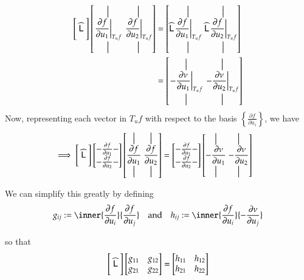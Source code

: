 	\begin{align}
	\Bigg[ \;\widehat{\mathsf{L}}\; \Bigg]
	\left[ \overset{\big\vert}{\underset{\big\vert}{\left.\frac{\partial f}{\partial u_1}\right|_{T_u f}}} \;
			\overset{\big\vert}{\underset{\big\vert}{\left.\frac{\partial f}{\partial u_2}\right|_{T_u f}}} \right]
			&= \left[ \widehat{\mathsf{L}} \overset{\big\vert}{\underset{\big\vert}{\left.\frac{\partial f}{\partial u_1}\right|_{T_u f}}} \;
			\widehat{\mathsf{L}} \overset{\big\vert}{\underset{\big\vert}{\left.\frac{\partial f}{\partial u_2}\right|_{T_u f}}} \right] \\
			&= \left[ \overset{\big\vert}{\underset{\big\vert}{ \left.-\frac{\partial \nu}{\partial u_1}\right|_{T_u f}}} \;
			\overset{\big\vert}{\underset{\big\vert}{\left.-\frac{\partial \nu}{\partial u_2}\right|_{T_u f}}} \right]
			\end{align}
			Now, representing each vector in  $T_u f$ with respect to the basis $\left\{ \frac{\partial f}{\partial u_i}\right\}$, we have
			\begin{align}
			\implies
			\Bigg[ \;\widehat{\mathsf{L}}\; \Bigg]
			\begin{bmatrix} - \frac{\partial f}{\partial u_1} - \\
				- \frac{\partial f}{\partial u_2} -
							\end{bmatrix}
			\left[ \overset{\big\vert}{\underset{\big\vert}{\frac{\partial f}{\partial u_1}}} \;
				\overset{\big\vert}{\underset{\big\vert}{\frac{\partial f}{\partial u_2}}}\right]
				&= \begin{bmatrix} - \frac{\partial f}{\partial u_1} - \\
				- \frac{\partial f}{\partial u_2} -
				\end{bmatrix}
				\left[ \overset{\big\vert}{\underset{\big\vert}{-\frac{\partial \nu}{\partial u_1}}} \;
				\overset{\big\vert}{\underset{\big\vert}{-\frac{\partial \nu}{\partial u_2}}}\right]
	\end{align}
		 
	We can simplify this greatly by defining 
	\begin{equation}\label{fundamentalformcoefficients}
	g_{ij} := \inner{\frac{\partial f}{\partial u_i}}{\frac{\partial f}{\partial u_j}}
	\quad \textrm{and}\quad
	h_{ij} := \inner{\frac{\partial f}{\partial u_i}}{-\frac{\partial \nu}{\partial u_j}}
	\end{equation}
	
	so that
	\begin{equation}
	\Bigg[ \;\widehat{\mathsf{L}}\; \Bigg]
	\begin{bmatrix} g_{11} & g_{12} \\ g_{21} & g_{22} \end{bmatrix}
	= \begin{bmatrix} h_{11} & h_{12} \\ h_{21} & h_{22} \end{bmatrix}
	\end{equation}
	
